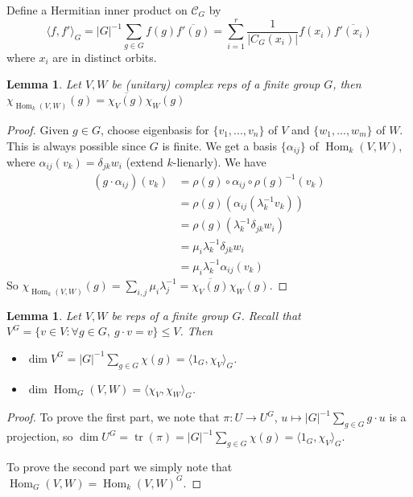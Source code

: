 \documentclass{article}
\theoremstyle{definition}
\theoremstyle{remark}
\theoremstyle{plain}
\newtheorem{lem}[defn]{Lemma}
\newcommand{\Hom}{\operatorname{Hom}}
\begin{document}
Define a Hermitian inner product on $\mathcal{C}_G$ by
\[\langle f,f'\rangle_G=|G|^{-1}\sum_{g\in G}f(g)\overline{f'(g)}=\sum_{i=1}^r\dfrac{1}{|C_G(x_i)|}f(x_i)\overline{f'(x_i)}\]
where $x_i$ are in distinct orbits.

\begin{lem}
Let $V,W$ be (unitary) complex reps of a finite group $G$, then
    $\chi_{\Hom_k(V,W)}(g)=\overline{\chi_V(g)}\chi_W(g)$
\end{lem}
\begin{proof}
    Given $g\in G$, choose eigenbasis for $\{v_1,...,v_n\}$ of $V$ and $\{w_1,...,w_m\}$ of $W$. This is always possible since $G$ is finite. We get a basis $\{\alpha_{ij}\}$ of $\Hom_k(V,W)$, where $\alpha_{ij}(v_k)=\delta_{jk}w_i$ (extend $k$-lienarly). We have
    \begin{align*}
        (g\cdot\alpha_{ij})(v_k)&=\rho(g)\circ\alpha_{ij}\circ\rho(g)^{-1}(v_k)\\
        &=\rho(g)(\alpha_{ij}(\lambda_k^{-1}v_k))\\
        &=\rho(g)(\lambda_k^{-1}\delta_{jk}w_i)\\
        &=\mu_i\lambda_k^{-1}\delta_{jk}w_i\\
        &=\mu_i\lambda_k^{-1}\alpha_{ij}(v_k)
    \end{align*}
    So $\chi_{\Hom_k(V,W)}(g)=\sum_{i,j}\mu_i\lambda_j^{-1}=\overline{\chi_V(g)}\chi_W(g)$.
\end{proof}
\begin{lem}
    Let $V,W$ be reps of a finite group $G$. Recall that $V^G=\{v\in V:\forall g\in G,\ g\cdot v=v\}\le V$. Then
    \begin{itemize}
        \item $\dim V^G=|G|^{-1}\sum_{g\in G}\chi(g)=\langle1_G,\chi_V\rangle_G$.
        \item $\dim\Hom_G(V,W)=\langle\chi_V,\chi_W\rangle_G$.
    \end{itemize}
\end{lem}
\begin{proof}
    To prove the first part, we note that $\pi:U\to U^G$, $u\mapsto |G|^{-1}\sum_{g\in G} g\cdot u$ is a projection, so $\dim U^G=\operatorname{tr}(\pi)=|G|^{-1}\sum_{g\in G}\chi(g)=\langle 1_G,\chi_V\rangle_G$.

    To prove the second part we simply note that $\Hom_G(V,W)=\Hom_k(V,W)^G$.
\end{proof}
\end{document}
